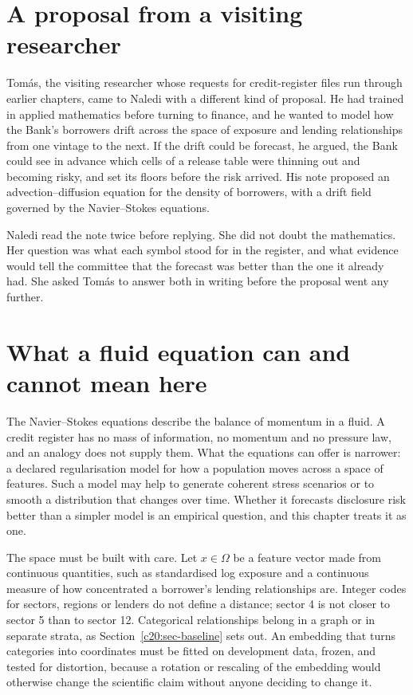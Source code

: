 \section{A proposal from a visiting researcher}

Tom\'as, the visiting researcher whose requests for credit-register files run through earlier
chapters, came to Naledi with a different kind of proposal. He had trained in applied mathematics before turning to finance, and he wanted to model how the Bank's borrowers drift
across the space of exposure and lending relationships from one vintage to the next. If the
drift could be forecast, he argued, the Bank could see in advance which cells of a release
table were thinning out and becoming risky, and set its floors before the risk arrived. His
note proposed an advection--diffusion equation for the density of borrowers, with a drift
field governed by the Navier--Stokes equations.

Naledi read the note twice before replying. She did not doubt the mathematics. Her
question was what each symbol stood for in the register, and what evidence would tell the
committee that the forecast was better than the one it already had. She asked Tom\'as to
answer both in writing before the proposal went any further.

\section{What a fluid equation can and cannot mean here}

The Navier--Stokes equations describe the balance of momentum in a fluid. A credit register
has no mass of information, no momentum and no pressure law, and an analogy does not
supply them. What the equations can offer is narrower: a declared regularisation model
for how a population moves across a space of features. Such a model may help to generate
coherent stress scenarios or to smooth a distribution that changes over time. Whether it forecasts disclosure risk better than a simpler model is an empirical question, and this chapter
treats it as one.

The space must be built with care. Let $x\in\Omega$ be a feature vector made from continuous
quantities, such as standardised log exposure and a continuous measure of how concentrated a borrower's lending relationships are. Integer codes for sectors, regions or lenders
do not define a distance; sector 4 is not closer to sector 5 than to sector 12. Categorical relationships belong in a graph or in separate strata, as Section~\ref{c20:sec-baseline} sets out. An embedding
that turns categories into coordinates must be fitted on development data, frozen, and tested
for distortion, because a rotation or rescaling of the embedding would otherwise change the
scientific claim without anyone deciding to change it.

